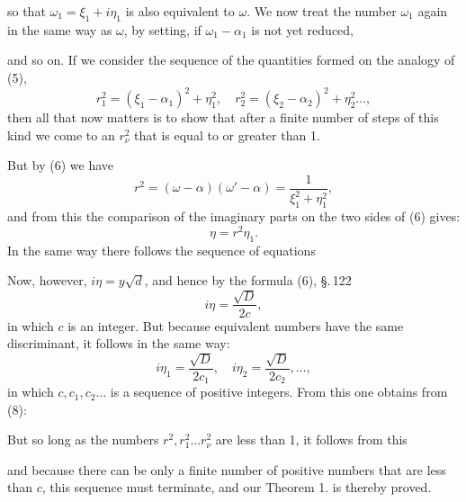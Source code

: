 


so that $\omega_1 = \xi_1 + i\eta_1$ is also equivalent to $\omega$. We now treat the
number $\omega_1$ again in the same way as $\omega$, by setting, if $\omega_1 - \alpha_1$
is not yet reduced,


and so on. If we consider the sequence of the quantities formed on the analogy of (5),
\[
r_1^2 = (\xi_1-\alpha_1)^2 + \eta_1^2, \quad r_2^2 = (\xi_2-\alpha_2)^2 + \eta_2^2 \ldots,
\]
then all that now matters is to show that after a finite number of steps
of this kind we come to an $r_\nu^2$ that is equal to or greater
than 1.

But by (6) we have
\[
r^2 = (\omega-\alpha)(\omega'-\alpha) = \dfrac{1}{\xi_1^2+\eta_1^2},
\]
and from this the comparison of the imaginary parts on the two
sides of (6) gives:
\[
\eta = r^2 \eta_1.
\]
In the same way there follows the sequence of equations


Now, however, $i\eta = y\sqrt{d}$, and hence by the formula (6), \S.\,122
\[
i\eta = \dfrac{\sqrt{D}}{2c},
\]
in which $c$ is an integer. But because equivalent numbers have the same
discriminant, it follows in the same way:
\[
i\eta_1 = \dfrac{\sqrt{D}}{2c_1}, \quad i\eta_2 = \dfrac{\sqrt{D}}{2c_2}, \ldots,
\]
in which $c, c_1, c_2 \ldots$ is a sequence of positive integers. From this
one obtains from (8):


But so long as the numbers $r^2, r_1^2 \ldots r_\nu^2$ are less than 1, it follows from this


and because there can be only a finite number of positive numbers that are
less than $c$, this sequence must terminate, and our Theorem 1.
is thereby proved.
